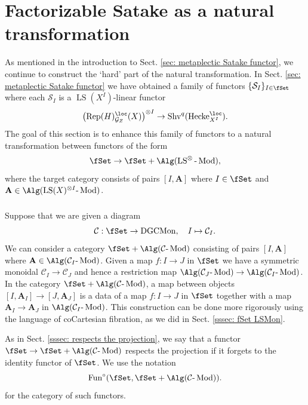 \documentclass[10pt]{amsart}
\newcommand{\sssec}{\subsubsection}
\theoremstyle{remark}
\newcommand{\on}{\operatorname}
\newcommand{\cC}{\mathcal{C}}
\newcommand{\cG}{\mathcal{G}}
\newcommand{\cS}{\mathcal{S}}
\newcommand{\DGCatSymMon}{\on{DGCMon}}
\newcommand{\lMod}{\text{-}\on{Mod}}
\newcommand{\Rep}{\on{Rep}}
\newcommand{\Shv}{\on{Shv}}
\newcommand{\LS}{\on{LS}}
\newcommand{\Fun}{\on{Fun}}
\newcommand{\bA}{\mathbf{A}}
\newcommand{\Hecke}{\on{Hecke}}
\begin{document}
\section{Factorizable Satake as a natural transformation}\label{sec: Satake as a nat transf}
As mentioned in the introduction to Sect. \ref{sec: metaplectic Satake functor}, we continue to construct the `hard' part of the natural transformation. In Sect. \ref{sec: metaplectic Satake functor} we have obtained a family of functors $\{\cS_I\}_{I\in\fSet}$ where each $\cS_I$ is a $\LS(X^I)$-linear functor
\[\left(\Rep(H)^{\loc}_{\cG_Z}(X)\right)^{\otimes I}\rightarrow \Shv^q(\Hecke^{\loc}_{X^I}).\]
The goal of this section is to enhance this family of functors to a natural transformation between functors of the form
\begin{equation}\label{eq: fSet to fSet Alg}
    \fSet\rightarrow \fSet + \Alg(\LS^{\otimes}\lMod),
\end{equation}
where the target category consists of pairs $[I,\bA]$ where $I\in\fSet$ and $\bA\in\Alg(\LS(X)^{\otimes I}\lMod)$. 


\sssec{}\label{sssec: Alg LS construction}
Suppose that we are given a diagram
\[\cC: \fSet\rightarrow \DGCatSymMon, \quad I\mapsto \cC_I.\]
We can consider a category $\fSet + \Alg(\cC\lMod)$ consisting of pairs $[I,\bA]$ where $\bA\in\Alg(\cC_I\lMod)$. Given a map $f:I\rightarrow J$ in $\fSet$ we have a symmetric monoidal $\cC_I\rightarrow \cC_J$ and hence a restriction map $\Alg(\cC_J\lMod)\rightarrow \Alg(\cC_I\lMod)$. In the category $\fSet + \Alg(\cC\lMod)$, a map between objects $[I,\bA_I]\rightarrow [J,\bA_J]$ is a data of a map $f:I\rightarrow J$ in $\fSet$ together with a map $\bA_I\rightarrow \bA_J$ in $\Alg(\cC_I\lMod)$. This construction can be done more rigorously using the language of coCartesian fibration, as we did in Sect. \ref{sssec: fSet LSMon}. 
\medskip

As in Sect. \ref{sssec: respects the projection}, we say that a functor $\fSet\rightarrow \fSet+\Alg(\cC\lMod)$ respects the projection if it forgets to the identity functor of $\fSet$. We use the notation
\[\Fun^{\circ}(\fSet,\fSet+\Alg(\cC\lMod)).\]
for the category of such functors. 
\medskip
\end{document}
